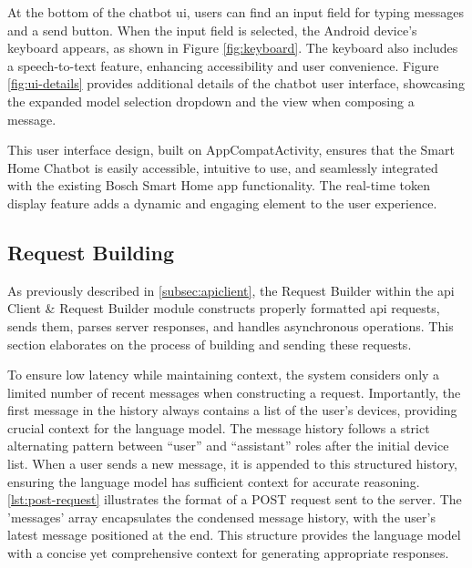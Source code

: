 At the bottom of the chatbot \gls{ui}, users can find an input field for typing messages and a send button. When the input field is selected, the Android device's keyboard appears, as shown in Figure \ref{fig:keyboard}. The keyboard also includes a speech-to-text feature, enhancing accessibility and user convenience.
Figure \ref{fig:ui-details} provides additional details of the chatbot user interface, showcasing the expanded model selection dropdown and the view when composing a message.

This user interface design, built on AppCompatActivity, ensures that the Smart Home Chatbot is easily accessible, intuitive to use, and seamlessly integrated with the existing Bosch Smart Home app functionality. The real-time token display feature adds a dynamic and engaging element to the user experience.


\subsection{Request Building}
\label{sec:req-building}
As previously described in \cref{subsec:apiclient}, the Request Builder within the \gls{api} Client \& Request Builder module constructs properly formatted \gls{api} requests, sends them, parses server responses, and handles asynchronous operations.
This section elaborates on the process of building and sending these requests.

To ensure low latency while maintaining context, the system considers only a limited number of recent messages when constructing a request. Importantly, the first message in the history always contains a list of the user's devices, providing crucial context for the language model.
The message history follows a strict alternating pattern between ``user'' and ``assistant'' roles after the initial device list. When a user sends a new message, it is appended to this structured history, ensuring the language model has sufficient context for accurate reasoning.
\cref{lst:post-request} illustrates the format of a POST request sent to the server. The 'messages' array encapsulates the condensed message history, with the user's latest message positioned at the end. This structure provides the language model with a concise yet comprehensive context for generating appropriate responses.

